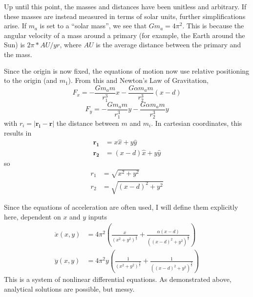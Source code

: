 \documentclass[preprint,titlepage,preprintnumbers,amsmath,amssymb,aps,11pt]{revtex4-2}
\begin{document}
Up until this point, the masses and distances have been unitless and arbitrary. If these masses are instead measured in terms of solar units, further simplifications arise. If $m_a$ is set to a “solar mass”, we see that $Gm_a=4\pi^2$. This is because the angular velocity of a mass around a primary (for example, the Earth around the Sun) is $2\pi*AU/yr$, where $AU$ is the average distance between the primary and the mass.

Since the origin is now fixed, the equations of motion now use relative positioning to the origin (and $m_1$). From this and Newton's Law of Gravitation,
\begin{equation}
    F_x=-\frac{Gm_a m}{r_1^3}x-\frac{G\alpha m_a m}{r_2^3}(x-d)
    \label{eq:fx}
\end{equation}
\begin{equation}
    F_y=-\frac{Gm_a m}{r_1^3}y-\frac{G\alpha m_a m}{r_2^3}y
    \label{eq:fy}
\end{equation}
with $r_i=|\bm{r_i}-\bm{r}|$ the distance between $m$ and $m_i$. In cartesian coordinates, this results in
\begin{equation}
    \begin{aligned}
        \bm{r_1} & =x\hat{x}+y\hat{y}     \\
        \bm{r_2} & =(x-d)\hat{x}+y\hat{y}
    \end{aligned}
\end{equation}
so
\begin{equation}
    \begin{aligned}
        r_1 & =\sqrt{x^2+y^2}     \\
        r_2 & =\sqrt{(x-d)^2+y^2}
    \end{aligned}
\end{equation}

Since the equations of acceleration are often used, I will define them explicitly here, dependent on $x$ and $y$ inputs
\begin{equation}
    \begin{aligned}
        \ddot{x}(x,y) & = 4\pi^2(\frac{x}{(x^2+y^2)^{\frac{3}{2}}}+\frac{\alpha(x-d)}{((x-d)^2+y^2)^{\frac{3}{2}}}) \\
        \ddot{y}(x,y) & = 4\pi^2y(\frac{1}{(x^2+y^2)^{\frac{3}{2}}}+\frac{1}{((x-d)^2+y^2)^{\frac{3}{2}}})
    \end{aligned}
\end{equation}
This is a system of nonlinear differential equations. As demonstrated above, analytical solutions are possible, but messy.
\end{document}
